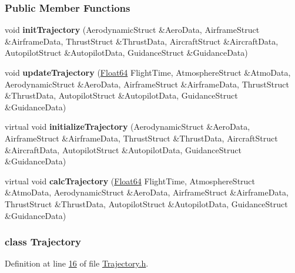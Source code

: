\subsubsection*{Public Member Functions}
\begin{DoxyCompactItemize}
\item 
\mbox{\label{group___trajectory_ae4267c6da15283259c118d9d46db4624}} 
void {\bfseries init\+Trajectory} (Aerodynamic\+Struct \&Aero\+Data, Airframe\+Struct \&Airframe\+Data, Thrust\+Struct \&Thrust\+Data, Aircraft\+Struct \&Aircraft\+Data, Autopilot\+Struct \&Autopilot\+Data, Guidance\+Struct \&Guidance\+Data)
\item 
\mbox{\label{group___trajectory_acd29eefc611701b4916d5eae1d520dac}} 
void {\bfseries update\+Trajectory} (\hyperlink{group___tools_ga3f1431cb9f76da10f59246d1d743dc2c}{Float64} Flight\+Time, Atmosphere\+Struct \&Atmo\+Data, Aerodynamic\+Struct \&Aero\+Data, Airframe\+Struct \&Airframe\+Data, Thrust\+Struct \&Thrust\+Data, Autopilot\+Struct \&Autopilot\+Data, Guidance\+Struct \&Guidance\+Data)
\item 
\mbox{\label{group___trajectory_a7376cf0cbc6b83386d6fa87a40ff0f45}} 
virtual void {\bfseries initialize\+Trajectory} (Aerodynamic\+Struct \&Aero\+Data, Airframe\+Struct \&Airframe\+Data, Thrust\+Struct \&Thrust\+Data, Aircraft\+Struct \&Aircraft\+Data, Autopilot\+Struct \&Autopilot\+Data, Guidance\+Struct \&Guidance\+Data)
\item 
\mbox{\label{group___trajectory_a52d7472170107e6d884554aac66b25a2}} 
virtual void {\bfseries calc\+Trajectory} (\hyperlink{group___tools_ga3f1431cb9f76da10f59246d1d743dc2c}{Float64} Flight\+Time, Atmosphere\+Struct \&Atmo\+Data, Aerodynamic\+Struct \&Aero\+Data, Airframe\+Struct \&Airframe\+Data, Thrust\+Struct \&Thrust\+Data, Autopilot\+Struct \&Autopilot\+Data, Guidance\+Struct \&Guidance\+Data)
\end{DoxyCompactItemize}
\label{class_trajectory}
\subsubsection{class Trajectory}


Definition at line \hyperlink{_trajectory_8h_source_l00016}{16} of file \hyperlink{_trajectory_8h_source}{Trajectory.\+h}.

